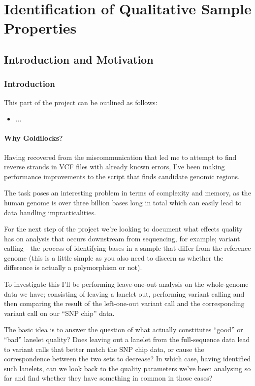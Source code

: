 \part{Identification of Qualitative Sample Properties}
\chapter{Introduction and Motivation}

\section{Introduction}

This part of the project can be outlined as follows:

\begin{itemize}
    \item ...
\end{itemize}

\subsection{Why Goldilocks?}
Having recovered from the miscommunication that led me to attempt to find
reverse strands in VCF files with already known errors, I’ve been making
performance improvements to the script that finds candidate genomic regions.

The task poses an interesting problem in terms of complexity and memory, as the
human genome is over three billion bases long in total which can easily lead to
data handling impracticalities.

For the next step of the project we’re looking to document what effects quality
has on analysis that occurs downstream from sequencing, for example; variant
calling - the process of identifying bases in a sample that differ from the
reference genome (this is a little simple as you also need to discern as
whether the difference is actually a polymorphism or not).

To investigate this I’ll be performing leave-one-out analysis on the
whole-genome data we have; consisting of leaving a lanelet out, performing
variant calling and then comparing the result of the left-one-out variant call
and the corresponding variant call on our “SNP chip” data.

The basic idea is to answer the question of what actually constitutes “good” or
“bad” lanelet quality? Does leaving out a lanelet from the full-sequence data
lead to variant calls that better match the SNP chip data, or cause the
correspondence between the two sets to decrease? In which case, having
identified such lanelets, can we look back to the quality parameters we’ve been
analysing so far and find whether they have something in common in those cases?

